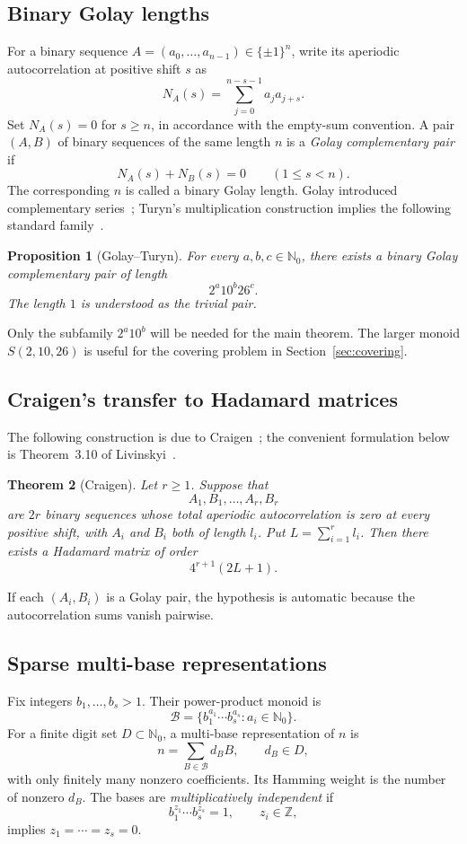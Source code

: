 \documentclass[11pt]{article}
\newtheorem{theorem}{Theorem}[section]
\newtheorem{proposition}[theorem]{Proposition}
\newcommand{\N}{\mathbb{N}}
\begin{document}
\subsection{Binary Golay lengths}
For a binary sequence $A=(a_0,\ldots,a_{n-1})\in\{\pm1\}^n$, write its aperiodic autocorrelation at positive shift $s$ as
\[
N_A(s)=\sum_{j=0}^{n-s-1}a_j a_{j+s}.
\]
Set $N_A(s)=0$ for $s\ge n$, in accordance with the empty-sum convention. A pair $(A,B)$ of binary sequences of the same length $n$ is a \emph{Golay complementary pair} if
\[
N_A(s)+N_B(s)=0\qquad(1\le s<n).
\]
The corresponding $n$ is called a binary Golay length.  Golay introduced complementary series~\cite{Golay1961}; Turyn's multiplication construction implies the following standard family~\cite{Turyn1974}.

\begin{proposition}[Golay--Turyn]\label{prop:golaylengths}
For every $a,b,c\in\N_0$, there exists a binary Golay complementary pair of length
\[
2^a10^b26^c.
\]
The length $1$ is understood as the trivial pair.
\end{proposition}

Only the subfamily $2^a10^b$ will be needed for the main theorem.  The larger monoid $S(2,10,26)$ is useful for the covering problem in Section~\ref{sec:covering}.

\subsection{Craigen's transfer to Hadamard matrices}
The following construction is due to Craigen~\cite{Craigen1995}; the convenient formulation below is Theorem~3.10 of Livinskyi~\cite{Livinskyi2012}.

\begin{theorem}[Craigen]\label{thm:craigen-transfer}
Let $r\ge1$. Suppose that
\[
A_1,B_1,\ldots,A_r,B_r
\]
are $2r$ binary sequences whose total aperiodic autocorrelation is zero at every positive shift, with $A_i$ and $B_i$ both of length $l_i$.  Put $L=\sum_{i=1}^r l_i$.  Then there exists a Hadamard matrix of order
\[
4^{r+1}(2L+1).
\]
\end{theorem}

If each $(A_i,B_i)$ is a Golay pair, the hypothesis is automatic because the autocorrelation sums vanish pairwise.

\subsection{Sparse multi-base representations}
Fix integers $b_1,\ldots,b_s>1$.  Their power-product monoid is
\[
\mathcal B=\{b_1^{a_1}\cdots b_s^{a_s}:a_i\in\N_0\}.
\]
For a finite digit set $D\subset\N_0$, a multi-base representation of $n$ is
\[
 n=\sum_{B\in\mathcal B} d_BB,
 \qquad d_B\in D,
\]
with only finitely many nonzero coefficients.  Its Hamming weight is the number of nonzero $d_B$.  The bases are \emph{multiplicatively independent} if
\[
b_1^{z_1}\cdots b_s^{z_s}=1,\qquad z_i\in\mathbb Z,
\]
implies $z_1=\cdots=z_s=0$.
\end{document}
